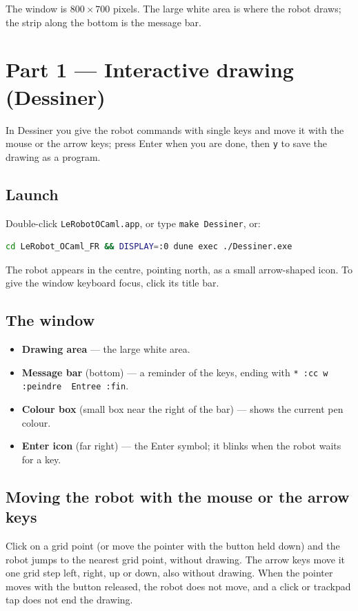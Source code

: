\documentclass[11pt,a4paper]{article}
\newcommand{\kbd}[1]{\texttt{#1}}
\begin{document}
The window is $800 \times 700$ pixels. The large white area is where the
robot draws; the strip along the bottom is the message bar.

\section{Part 1 --- Interactive drawing (Dessiner)}

In Dessiner you give the robot commands with single keys and move it with
the mouse or the arrow keys; press Enter when you are done, then \kbd{y} to
save the drawing as a program.

\subsection{Launch}
Double-click \kbd{LeRobotOCaml.app}, or type \kbd{make Dessiner}, or:
\begin{lstlisting}[language=bash]
cd LeRobot_OCaml_FR && DISPLAY=:0 dune exec ./Dessiner.exe
\end{lstlisting}
The robot appears in the centre, pointing north, as a small arrow-shaped
icon. To give the window keyboard focus, click its title bar.

\subsection{The window}
\begin{itemize}
\item \textbf{Drawing area} --- the large white area.
\item \textbf{Message bar} (bottom) --- a reminder of the keys, ending with
  \kbd{* :cc w :peindre\ \ Entree :fin}.
\item \textbf{Colour box} (small box near the right of the bar) --- shows
  the current pen colour.
\item \textbf{Enter icon} (far right) --- the Enter symbol; it blinks when
  the robot waits for a key.
\end{itemize}

\subsection{Moving the robot with the mouse or the arrow keys}
Click on a grid point (or move the pointer with the button held down) and
the robot jumps to the nearest grid point, without drawing. The arrow keys
move it one grid step left, right, up or down, also without drawing. When
the pointer moves with the button released, the robot does not move, and a
click or trackpad tap does not end the drawing.
\end{document}

